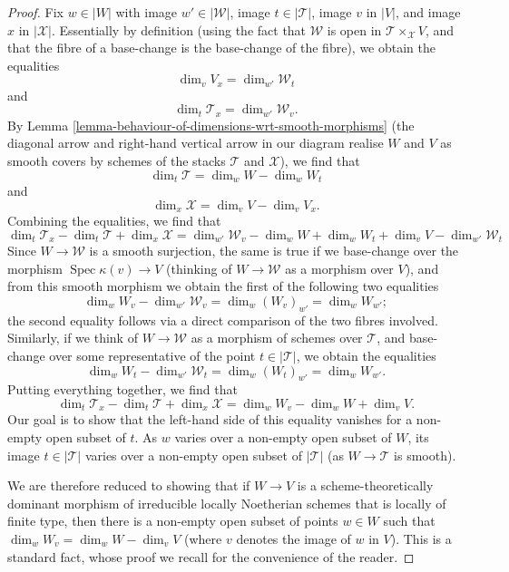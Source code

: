 \documentclass{stacks-project}
\theoremstyle{plain}
\theoremstyle{definition}
\theoremstyle{remark}
\numberwithin{equation}{subsection}
\def\Spec{\mathop{\mathrm{Spec}}}
\begin{document}
\begin{proof}
\medskip\noindent
Fix $w \in |W|$ with image $w' \in |\mathcal{W}|$,
image $t \in |\mathcal{T}|$, image $v$ in $|V|$,
and image $x$ in $|\mathcal{X}|$.
Essentially by definition (using the
fact that $\mathcal{W}$ is open in $\mathcal{T}\times_{\mathcal{X}} V$, and that
the fibre of a base-change is the base-change of the fibre),
we obtain the equalities
$$
\dim_v V_x = \dim_{w'} \mathcal{W}_t
$$
and
$$
\dim_t \mathcal{T}_x = \dim_{w'} \mathcal{W}_v.
$$
By Lemma \ref{lemma-behaviour-of-dimensions-wrt-smooth-morphisms}
(the diagonal arrow and right-hand vertical
arrow in our diagram realise $W$ and $V$ as smooth covers by
schemes of the stacks $\mathcal{T}$ and $\mathcal{X}$), we find that
$$
\dim_t \mathcal{T} = \dim_w W - \dim_w W_t
$$
and
$$
\dim_x \mathcal{X} = \dim_v V - \dim_v V_x.
$$
Combining the equalities, we find that
$$
\dim_t \mathcal{T}_x - \dim_t \mathcal{T} + \dim_x \mathcal{X}
= \dim_{w'} \mathcal{W}_v - \dim_w W + \dim_w W_t + \dim_v V -
\dim_{w'} \mathcal{W}_t
$$
Since $W \to \mathcal{W}$ is a smooth surjection, the same is true
if we base-change over the morphism $\Spec \kappa(v) \to V$
(thinking of $W \to \mathcal{W}$ as a morphism over $V$),
and from this smooth morphism we obtain the first of the following
two equalities
$$
\dim_w W_v - \dim_{w'} \mathcal{W}_v = \dim_w (W_v)_{w'} = \dim_w W_{w'};
$$
the second equality follows via a direct comparison of the
two fibres involved.
Similarly, if we think of $W \to \mathcal{W}$ as a morphism of schemes
over $\mathcal{T}$, and base-change over some representative of the point
$t \in |\mathcal{T}|$, we obtain the equalities
$$
\dim_w W_t - \dim_{w'} \mathcal{W}_t = \dim_w (W_t)_{w'} = \dim_w W_{w'}.
$$
Putting everything together, we find that
$$
\dim_t \mathcal{T}_x - \dim_t \mathcal{T} + \dim_x \mathcal{X}
=  \dim_w W_v - \dim_w W + \dim_v V.
$$
Our goal is to show that the left-hand side of this equality
vanishes for a non-empty open subset
of $t$.  As $w$ varies over a non-empty open subset of $W$,
its image $t \in |\mathcal{T}|$ varies over a non-empty open
subset of $|\mathcal{T}|$ (as $W \to \mathcal{T}$ is smooth).

\medskip\noindent
We are therefore reduced to showing that if $W\to V$ is a
scheme-theoretically dominant morphism of irreducible locally
Noetherian schemes that is locally of finite type,
then there is a non-empty open subset of
points $w\in W$ such that $\dim_w W_v =\dim_w W - \dim_v V$
(where $v$ denotes the image of $w$ in $V$).
This is a standard fact,
whose proof we recall for the convenience of the reader.


\end{proof}
\end{document}
